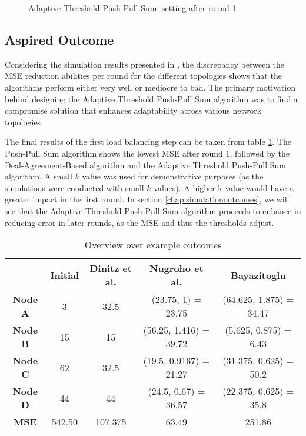 \begin{figure}
    \centering
    \scalebox{0.75}{}
    \caption{Adaptive Threshold Push-Pull Sum: setting after round 1}
    \label{fig:ATPPSExampleResult}
\end{figure}
\subsection{Aspired Outcome}\label{subsec:aspiredOutcomeAdaptiveThresholdPPS}

Considering the simulation results presented in \cite{Bayazitoglu}, the discrepancy between the MSE reduction abilities per round for the different topologies shows that the algorithms perform either very well or mediocre to bad. The primary motivation behind designing the Adaptive Threshold Push-Pull Sum algorithm was to find a compromise solution that enhances adaptability across various network topologies.

The final results of the first load balancing step can be taken from table \ref{tab:overviewExamples}. The Push-Pull Sum algorithm shows the lowest MSE after round 1, followed by the Deal-Agreement-Based algorithm and the Adaptive Threshold Push-Pull Sum algorithm. A small $k$ value was used for demonstrative purposes (as the simulations were conducted with small $k$ values). A higher k value would have a greater impact in the first round. In section \ref{chap:simulationoutcomes}, we will see that the Adaptive Threshold Push-Pull Sum algorithm proceeds to enhance in reducing error in later rounds, as the MSE and thus the thresholds adjust.

\begin{table}
\centering
\begin{tabular}{|c|c|c|c|c|}
\hline
 & \textbf{Initial} & \textbf{Dinitz et al.} & \textbf{Nugroho et al.} & \textbf{Bayazitoglu} \\ \hline
\textbf{Node A}  & 3      & 32.5    & (23.75, 1) = 23.75     & (64.625, 1.875) = 34.47 \\ \hline
\textbf{Node B}  & 15     & 15      & (56.25, 1.416) = 39.72 & (5.625, 0.875) = 6.43   \\ \hline
\textbf{Node C}  & 62     & 32.5    & (19.5, 0.9167) = 21.27 & (31.375, 0.625) = 50.2  \\ \hline
\textbf{Node D}  & 44     & 44      & (24.5, 0.67) = 36.57   & (22.375, 0.625) = 35.8  \\ \hline
\textbf{MSE} & 542.50 & 107.375 & 63.49                  & 251.86                  \\ \hline
\end{tabular}
\caption{Overview over example outcomes}
\label{tab:overviewExamples}
\end{table}